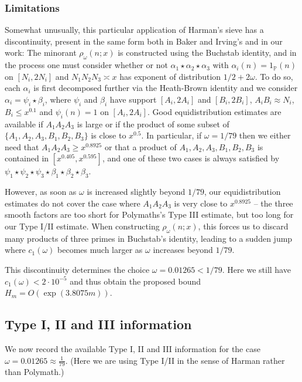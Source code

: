 \documentclass{amsart}
\numberwithin{equation}{section}
\begin{document}
\subsubsection{Limitations}
 Somewhat unusually, this particular application of Harman's sieve has a discontinuity, present in the same form both in Baker and Irving's and in our work: The minorant $\rho_\omega(n;x)$ is constructed using the Buchstab identity, and in the process one must consider whether or not $\alpha_1 \star \alpha_2 \star \alpha_3$ with $\alpha_i(n)=1_{\mathbb{P}}(n)$ on $[N_i,2N_i]$  and $N_1N_2N_3 \asymp x$ has exponent of distribution $1/2+2\omega$. To do so, each $\alpha_i$ is first decomposed further via the Heath-Brown identity and we consider $\alpha_i = \psi_i \star \beta_i$, where  $\psi_i$ and $\beta_i$ have support $[A_i,2A_i]$ and $[B_i,2B_i]$, $A_iB_i \approx N_i$, $B_i \leq x^{0.1}$ and $\psi_i(n)=1$ on $[A_i, 2A_i]$. Good equidistribution estimates are available if $A_1A_2A_3$ is large or if the product of some subset of $\{A_1,A_2,A_3,B_1,B_2,B_3\}$ is close to $x^{0.5}$. In particular, if $\omega =  1/79 $ then  we either need that $A_1A_2A_3 \geq x^{0.8925 }$ or that a product of $A_1,A_2,A_3,B_1,B_2,B_3$ is contained in $[x^{0.405},x^{0.595}]$, and one of these two cases is always satisfied by $\psi_1 \star \psi_2 \star \psi_3 \star \beta_1 \star \beta_2 \star \beta_3$.

\vspace{3mm} However, as soon as $\omega$ is increased slightly beyond $ 1/79 $, our equidistribution estimates do not cover the case where $A_1A_2A_3$ is very close to $x^{0.8925}$ -- the three smooth factors are too short for Polymaths's Type III estimate, but too long for our Type I/II estimate. When constructing $\rho_\omega(n;x)$, this forces us to discard many products of three primes in  Buchstab's identity, leading to a sudden jump where $c_1(\omega)$ becomes much larger as $\omega$ increases beyond $  1/79 $.

\vspace{3mm} This discontinuity  determines the choice $\omega = 0.01265 < 1/79$. Here we still have $c_1(\omega) < 2 \cdot 10^{-5}$ and thus obtain the proposed bound $H_m = O(\exp(3.8075m))$. 




\subsection{Type I, II and III information}

We now record the available Type I, II and III information for the case $\omega =0.01265 \approx \frac{1}{79}$. (Here we are using Type I/II in the sense of Harman rather than Polymath.) 
 
\end{document}
